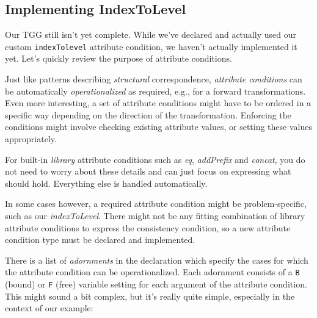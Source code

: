 \hypertarget{subsec:IndexToLevel}{}
\subsection{Implementing IndexToLevel}
\genHeader

Our TGG still isn't yet complete. 
While we've declared and actually used our custom \texttt{indexTolevel} attribute condition, we haven't actually implemented it yet. 
Let's quickly review the purpose of attribute conditions.

Just like patterns describing \emph{structural} correspondence, \emph{attribute conditions} can be automatically \emph{operationalized} as required, e.g., for a forward transformations. 
Even more interesting, a set of attribute conditions might have to be ordered in a specific way depending on the direction of the transformation.
Enforcing the conditions might involve checking existing attribute values, or setting these values appropriately.

For built-in \emph{library} attribute conditions such as \emph{eq}, \emph{addPrefix} and \emph{concat}, you do not need to worry about these details and can just focus
on expressing what should hold. 
Everything else is handled automatically.

In some cases however, a required attribute condition might be problem-specific, such as our \emph{indexToLevel}. 
There might not be any fitting combination of library attribute conditions to express the consistency condition, so a new attribute condition type must be declared and implemented.

There is a list of \emph{adornments} in the declaration which specify the cases for which the attribute condition can be operationalized. 
Each adornment consists of a \texttt{B} (bound) or \texttt{F} (free) variable setting for each argument of the attribute condition. 
This might sound a bit complex, but it's really quite simple, especially in the context of our example:

